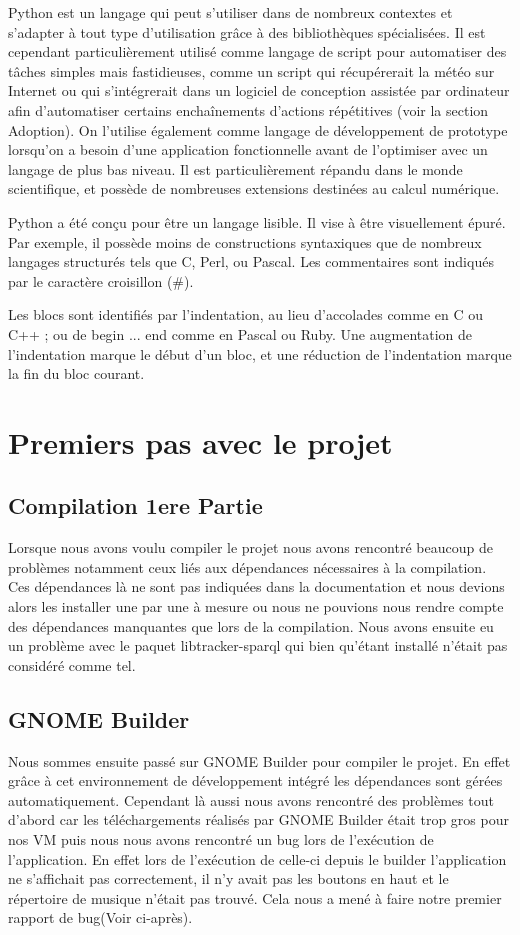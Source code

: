 \documentclass[12pt]{report}
\begin{document}
Python est un langage qui peut s'utiliser dans de nombreux contextes 
et s'adapter à tout type d'utilisation grâce à des bibliothèques 
spécialisées. Il est cependant particulièrement utilisé comme 
langage de script pour automatiser des tâches simples mais 
fastidieuses, comme un script qui récupérerait la météo sur Internet 
ou qui s'intégrerait dans un logiciel de conception assistée par 
ordinateur afin d'automatiser certains enchaînements d'actions 
répétitives (voir la section Adoption). On l'utilise également comme 
langage de développement de prototype lorsqu'on a besoin d'une 
application fonctionnelle avant de l'optimiser avec un langage 
de plus bas niveau. Il est particulièrement répandu dans le monde 
scientifique, et possède de nombreuses extensions destinées au 
calcul numérique.

Python a été conçu pour être un langage lisible. Il vise à être 
visuellement épuré. Par exemple, il possède moins de constructions 
syntaxiques que de nombreux langages structurés tels que C, 
Perl, ou Pascal. Les commentaires sont indiqués par le caractère 
croisillon (\#).

Les blocs sont identifiés par l'indentation, au lieu d'accolades 
comme en C ou C++ ; ou de begin ... end comme en Pascal ou Ruby. 
Une augmentation de l'indentation marque le début d'un bloc, et 
une réduction de l'indentation marque la fin du bloc courant. 

\section{Premiers pas avec le projet}
\subsection{Compilation 1ere Partie}
Lorsque nous avons voulu compiler le projet nous avons rencontré 
beaucoup de problèmes notamment ceux liés aux dépendances nécessaires
à la compilation. Ces dépendances là ne sont pas indiquées dans la
documentation et nous devions alors les installer une par une à
mesure ou nous ne pouvions nous rendre compte des dépendances 
manquantes que lors de la compilation. 
Nous avons ensuite eu un problème avec le paquet libtracker-sparql
qui bien qu'étant installé n’était pas considéré comme tel.

\subsection{GNOME Builder}
Nous sommes ensuite passé sur GNOME Builder pour compiler le projet.
En effet grâce à cet environnement de développement intégré les 
dépendances sont gérées automatiquement. Cependant là aussi nous
avons rencontré des problèmes tout d'abord car les téléchargements
réalisés par GNOME Builder était trop gros pour nos VM puis nous 
nous avons rencontré un bug lors de l’exécution de l'application.
En effet lors de l'exécution de celle-ci depuis le builder l'application
ne s'affichait pas correctement, il n'y avait pas les boutons en haut
et le répertoire de musique n’était pas trouvé. Cela nous a mené à 
faire notre premier rapport de bug(Voir ci-après).
\end{document}
